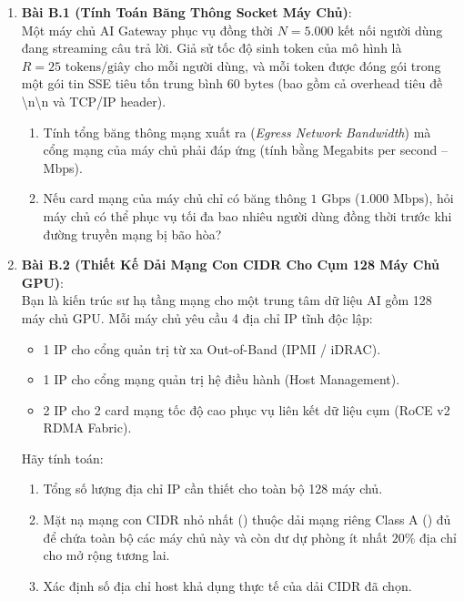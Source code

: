 \begin{enumerate}
  \item \textbf{Bài B.1 (Tính Toán Băng Thông Socket Máy Chủ)}: \\
  Một máy chủ AI Gateway phục vụ đồng thời $N = 5.000$ kết nối người dùng đang streaming câu trả lời. Giả sử tốc độ sinh token của mô hình là $R = 25\text{ tokens/giây}$ cho mỗi người dùng, và mỗi token được đóng gói trong một gói tin SSE tiêu tốn trung bình $60\text{ bytes}$ (bao gồm cả overhead tiêu đề \textbackslash n\textbackslash n và TCP/IP header).
  \begin{enumerate}
    \item Tính tổng băng thông mạng xuất ra (\textit{Egress Network Bandwidth}) mà cổng mạng của máy chủ phải đáp ứng (tính bằng Megabits per second -- Mbps).
    \item Nếu card mạng của máy chủ chỉ có băng thông $1\text{ Gbps}$ ($1.000\text{ Mbps}$), hỏi máy chủ có thể phục vụ tối đa bao nhiêu người dùng đồng thời trước khi đường truyền mạng bị bão hòa?
  \end{enumerate}

  \item \textbf{Bài B.2 (Thiết Kế Dải Mạng Con CIDR Cho Cụm 128 Máy Chủ GPU)}: \\
  Bạn là kiến trúc sư hạ tầng mạng cho một trung tâm dữ liệu AI gồm 128 máy chủ GPU. Mỗi máy chủ yêu cầu 4 địa chỉ IP tĩnh độc lập:
  \begin{itemize}
    \item 1 IP cho cổng quản trị từ xa Out-of-Band (IPMI / iDRAC).
    \item 1 IP cho cổng mạng quản trị hệ điều hành (Host Management).
    \item 2 IP cho 2 card mạng tốc độ cao phục vụ liên kết dữ liệu cụm (RoCE v2 RDMA Fabric).
  \end{itemize}
  Hãy tính toán:
  \begin{enumerate}
    \item Tổng số lượng địa chỉ IP cần thiết cho toàn bộ 128 máy chủ.
    \item Mặt nạ mạng con CIDR nhỏ nhất () thuộc dải mạng riêng Class A () đủ để chứa toàn bộ các máy chủ này và còn dư dự phòng ít nhất $20\%$ địa chỉ cho mở rộng tương lai.
    \item Xác định số địa chỉ host khả dụng thực tế của dải CIDR đã chọn.
  \end{enumerate}


\end{enumerate}

